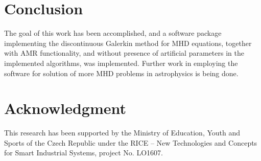 \documentclass[journal,transmag]{IEEEtran}
\begin{document}
\section{Conclusion}
The goal of this work has been accomplished, and a software package implementing the discontinuous Galerkin method for MHD equations, together with AMR functionality, and without presence of artificial parameters in the implemented algorithms, was implemented. Further work in employing the software for solution of more MHD problems in astrophysics is being done.

\section*{Acknowledgment}
This research has been supported by the Ministry of Education, Youth and Sports of the Czech Republic under the RICE – New Technologies and Concepts for Smart Industrial Systems, project No. LO1607.

\ifCLASSOPTIONcaptionsoff
  \newpage
\fi

%
%
%


%
%
\end{document}
